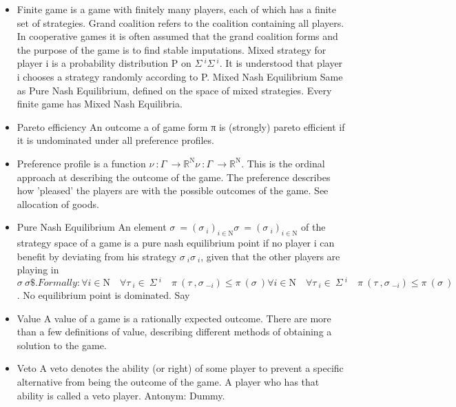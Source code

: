 \documentclass[]{report}
\begin{document}
\begin{itemize}
\item Finite game 
is a game with finitely many players, each of which has a finite set of strategies.
Grand coalition 
refers to the coalition containing all players. In cooperative games it is often assumed that the grand coalition forms and the purpose of the game is to find stable imputations.
Mixed strategy 
for player i is a probability distribution P on ${\displaystyle \Sigma \ ^{i}} \Sigma \ ^{i}$. It is understood that player i chooses a strategy randomly according to P.
Mixed Nash Equilibrium 
Same as Pure Nash Equilibrium, defined on the space of mixed strategies. Every finite game has Mixed Nash Equilibria.
\item Pareto efficiency 
An outcome a of game form π is (strongly) pareto efficient if it is undominated under all preference profiles.
\item Preference profile 
is a function ${\displaystyle \nu \ :\Gamma \ \to \mathbb {R} ^{\mathrm {N} }} \nu \ :\Gamma \ \to \mathbb {R} ^{\mathrm {N} }$. This is the ordinal approach at describing the outcome of the game. The preference describes how 'pleased' the players are with the possible outcomes of the game. See allocation of goods.
\item Pure Nash Equilibrium 
An element ${\displaystyle \sigma \ =(\sigma \ _{i})_{i\in \mathrm {N} }} \sigma \ =(\sigma \ _{i})_{i\in \mathrm {N} }$ of the strategy space of a game is a pure nash equilibrium point if no player i can benefit by deviating from his strategy ${\displaystyle \sigma \ _{i}} \sigma \ _{i}$, given that the other players are playing in ${\displaystyle \sigma \ } \sigma \$ . Formally:
{\displaystyle \forall i\in \mathrm {N} \quad \forall \tau \ _{i}\in \ \Sigma \ ^{i}\quad \pi \ (\tau \ ,\sigma \ _{-i})\leq \pi \ (\sigma \ )} \forall i\in \mathrm {N} \quad \forall \tau \ _{i}\in \ \Sigma \ ^{i}\quad \pi \ (\tau \ ,\sigma \ _{-i})\leq \pi \ (\sigma \ )$.
No equilibrium point is dominated.
Say 

\item Value 
A value of a game is a rationally expected outcome. There are more than a few definitions of value, describing different methods of obtaining a solution to the game.
\item Veto 
A veto denotes the ability (or right) of some player to prevent a specific alternative from being the outcome of the game. A player who has that ability is called a veto player.
Antonym: Dummy.


\end{itemize}
\end{document}
